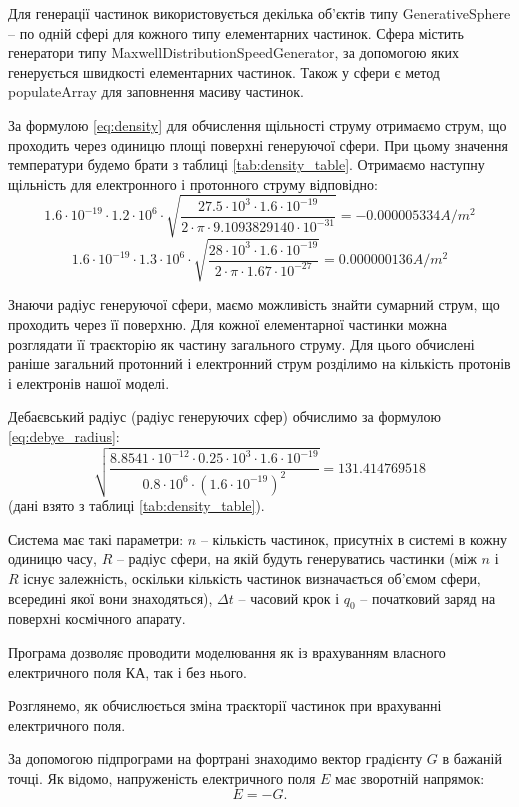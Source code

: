 \documentclass[a4paper,12pt]{article}
\begin{document}
Для генерації частинок використовується декілька об’єктів типу GenerativeSphere -- по одній сфері для кожного типу елементарних частинок. Сфера містить генератори типу MaxwellDistributionSpeedGenerator, за допомогою яких генерується швидкості елементарних частинок. Також у сфери є метод populateArray для заповнення масиву частинок.

За формулою \ref{eq:density} для обчислення щільності струму отримаємо струм, що проходить через одиницю площі поверхні генеруючої сфери. При цьому значення температури будемо брати з таблиці \ref{tab:density_table}. Отримаємо наступну щільність для електронного і протонного струму відповідно:
\[1.6 \cdot 10^{-19} \cdot 1.2 \cdot 10^6 \cdot \sqrt{\frac{27.5 \cdot 10^3 \cdot 1.6 \cdot 10^{-19}}{2 \cdot \pi \cdot 9.1093829140 \cdot 10^{-31}}} = -0.000005334 A/m^2\]
\[1.6 \cdot 10^{-19} \cdot 1.3 \cdot 10^6 \cdot \sqrt{\frac{28 \cdot 10^3 \cdot 1.6 \cdot 10^{-19}}{2 \cdot \pi \cdot 1.67 \cdot 10^{-27}}} = 0.000000136 A/m^2\]

Знаючи радіус генеруючої сфери, маємо можливість знайти сумарний струм, що проходить через її поверхню. Для кожної елементарної частинки можна розглядати її траєкторію як частину загального струму. Для цього обчислені раніше загальний протонний і електронний струм розділимо на кількість протонів і електронів нашої моделі.

Дебаєвський радіус (радіус генеруючих сфер) обчислимо за формулою \ref{eq:debye_radius}:
\[\sqrt{\frac{8.8541 \cdot 10^{-12} \cdot 0.25 \cdot 10^3 \cdot 1.6 \cdot 10^{-19}}{0.8 \cdot 10^6 \cdot (1.6 \cdot 10^{-19})^2}} = 131.414769518\]
(дані взято з таблиці \ref{tab:density_table}).

Система має такі параметри: $n$ -- кількість частинок, присутніх в системі в кожну одиницю часу, $R$ -- радіус сфери, на якій будуть генеруватись частинки (між $n$ і $R$ існує залежність, оскільки кількість частинок визначається об’ємом сфери, всередині якої вони знаходяться), $\Delta t$ -- часовий крок і $q_0$ -- початковий заряд на поверхні космічного апарату.
 
 Програма дозволяє проводити моделювання як із врахуванням власного електричного поля КА, так і без нього.

Розглянемо, як обчислюється зміна траєкторії частинок при врахуванні електричного поля.

За допомогою підпрограми на фортрані знаходимо вектор градієнту $G$ в бажаній точці. Як відомо, напруженість електричного поля $E$ має зворотній напрямок:
\[
E = -G.
\]
\end{document}

